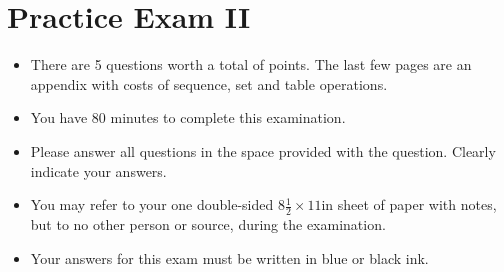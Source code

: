 \chapter{Practice Exam II}
\label{ch:::practice-exam-ii}

\begin{cluster}
\label{grp:prmbl:practice-exam-ii::questions}

\begin{preamble}
\label{prmbl:practice-exam-ii::questions}
\newcommand{\numquestions}{5}

\begin{itemize}
\item There are \numquestions{} questions worth a total of \numpoints{} points.
  The last few pages are an appendix with costs of sequence,
  set and table operations.
\item You have 80 minutes to complete this examination.
\item Please answer all questions in the space provided with the
  question.  Clearly indicate your answers.
\item You may refer to your one double-sided $8\frac{1}{2} \times 11$in
  sheet of paper with notes, but to no other person or source, during the
  examination.

\item Your answers for this exam must be written in blue or black ink.

\end{itemize}

\end{preamble}
\end{cluster}

\begin{cluster}
\label{grp:grm:practice-exam-ii::answers}

\begin{gram}
\label{grm:practice-exam-ii::answers}

\end{gram}
\end{cluster}

